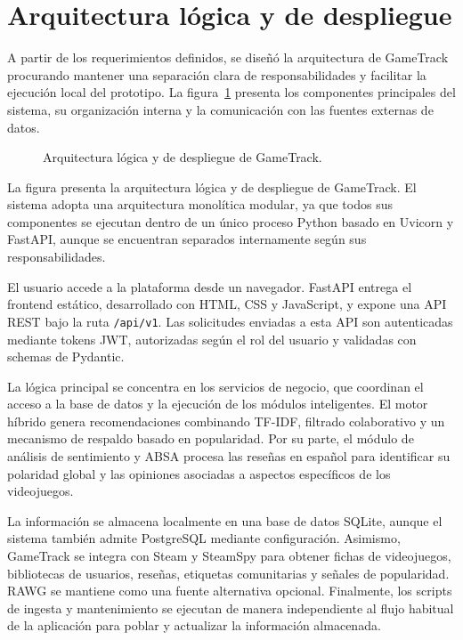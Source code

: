 \section{Arquitectura lógica y de despliegue}\label{sec:arquitectura}

A partir de los requerimientos definidos, se diseñó la arquitectura de GameTrack procurando mantener una separación clara de responsabilidades y facilitar la ejecución local del prototipo. La figura~\ref{fig:arquitectura} presenta los componentes principales del sistema, su organización interna y la comunicación con las fuentes externas de datos.

\begin{landscape}
\begin{figure}[H]
	\centering
	\caption{Arquitectura lógica y de despliegue de GameTrack.}
	\label{fig:arquitectura}
\end{figure}
\end{landscape}

La figura presenta la arquitectura lógica y de despliegue de GameTrack. El sistema adopta una arquitectura monolítica modular, ya que todos sus componentes se ejecutan dentro de un único proceso Python basado en Uvicorn y FastAPI, aunque se encuentran separados internamente según sus responsabilidades.

El usuario accede a la plataforma desde un navegador. FastAPI entrega el frontend estático, desarrollado con HTML, CSS y JavaScript, y expone una API REST bajo la ruta \texttt{/api/v1}. Las solicitudes enviadas a esta API son autenticadas mediante tokens JWT, autorizadas según el rol del usuario y validadas con schemas de Pydantic.

La lógica principal se concentra en los servicios de negocio, que coordinan el acceso a la base de datos y la ejecución de los módulos inteligentes. El motor híbrido genera recomendaciones combinando TF-IDF, filtrado colaborativo y un mecanismo de respaldo basado en popularidad. Por su parte, el módulo de análisis de sentimiento y ABSA procesa las reseñas en español para identificar su polaridad global y las opiniones asociadas a aspectos específicos de los videojuegos.

La información se almacena localmente en una base de datos SQLite, aunque el sistema también admite PostgreSQL mediante configuración. Asimismo, GameTrack se integra con Steam y SteamSpy para obtener fichas de videojuegos, bibliotecas de usuarios, reseñas, etiquetas comunitarias y señales de popularidad. RAWG se mantiene como una fuente alternativa opcional. Finalmente, los scripts de ingesta y mantenimiento se ejecutan de manera independiente al flujo habitual de la aplicación para poblar y actualizar la información almacenada.

